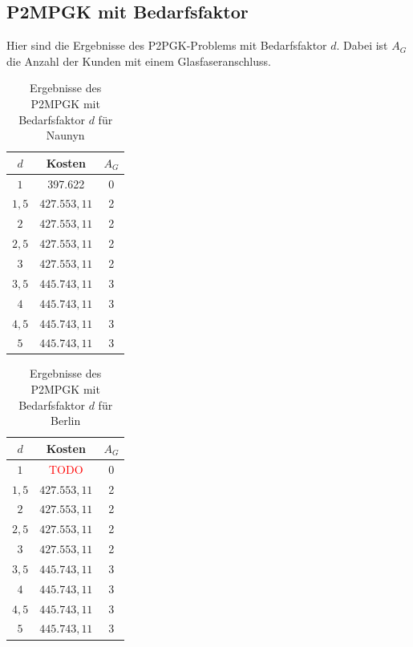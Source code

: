 \documentclass[11pt,a4paper]{article}
\newcommand{\TODO}{\textcolor{red}{TODO}}
\theoremstyle{my_th_style1}
\begin{document}
\subsection*{P2MPGK mit Bedarfsfaktor}
Hier sind die Ergebnisse des P2PGK-Problems mit Bedarfsfaktor $d$. Dabei ist $A_G$ die Anzahl der Kunden mit einem Glasfaseranschluss.
\begin{table}[!htbp]
	\centering
		\begin{tabular}{c|c|c}
	\centering
	$d$ & Kosten & $A_G$ \\	
	\hline
	$1$   	 &  397.622 & 0  \\
	$1,5$ 	&   $427.553,11$  & 2  \\
	$2$   	&   $427.553,11$ & 2  \\
	$2,5$   	&   $427.553,11$ & 2  \\
	$3$    &   $427.553,11$ & 2  \\
	$3,5$   	&   $445.743,11$ & 3  \\
	$4$   	&   $445.743,11$& 3  \\
	$4,5$    & $445.743,11$ & 3 \\
	$5$   	&   $445.743,11$& 3  \\
\end{tabular}
	\label{P2MPGKBedarfN}
	\caption{Ergebnisse des P2MPGK mit Bedarfsfaktor $d$ f\"ur Naunyn} 
\end{table}

\begin{table}[!htbp]
			\centering
			\begin{tabular}{c|c|c}
				\centering
				$d$ & Kosten & $A_G$ \\	
		\hline
	$1$   	 &  \TODO& 0  \\
	$1,5$ 	&   $427.553,11$  & 2  \\
	$2$   	&   $427.553,11$ & 2  \\
	$2,5$   	&   $427.553,11$ & 2  \\
	$3$    &   $427.553,11$ & 2  \\
	$3,5$   	&   $445.743,11$ & 3  \\
	$4$   	&   $445.743,11$& 3  \\
	$4,5$    & $445.743,11$ & 3 \\
	$5$   	&   $445.743,11$& 3  \\	
			\end{tabular}
			\label{P2PGKBedarfB}
			\caption{Ergebnisse des P2MPGK mit Bedarfsfaktor $d$ f\"ur Berlin} 
\end{table}
\end{document}
